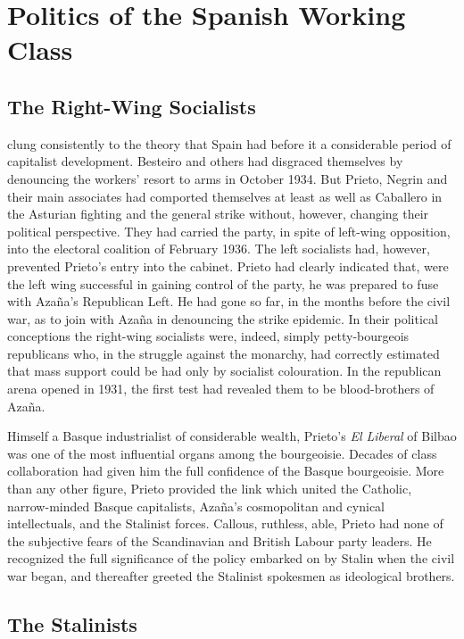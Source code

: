 \chapter{Politics of the Spanish Working Class}

\section{The Right-Wing Socialists}

 clung consistently to the theory that Spain had before it a considerable period of capitalist development. Besteiro and others had disgraced themselves by denouncing the workers’ resort to arms in October 1934. But Prieto, Negrin and their main associates had comported themselves at least as well as Caballero in the Asturian fighting and the general strike without, however, changing their political perspective. They had carried the party, in spite of left-wing opposition, into the electoral coalition of February 1936. The left socialists had, however, prevented Prieto’s entry into the cabinet. Prieto had clearly indicated that, were the left wing successful in gaining control of the party, he was prepared to fuse with Azaña’s Republican Left. He had gone so far, in the months before the civil war, as to join with Azaña in denouncing the strike epidemic. In their political conceptions the right-wing socialists were, indeed, simply petty-bourgeois republicans who, in the struggle against the monarchy, had correctly estimated that mass support could be had only by socialist colouration. In the republican arena opened in 1931, the first test had revealed them to be blood-brothers of Azaña.

Himself a Basque industrialist of considerable wealth, Prieto’s \emph{El Liberal} of Bilbao was one of the most influential organs among the bourgeoisie. Decades of class collaboration had given him the full confidence of the Basque bourgeoisie. More than any other figure, Prieto provided the link which united the Catholic, narrow-minded Basque capitalists, Azaña’s cosmopolitan and cynical intellectuals, and the Stalinist forces. Callous, ruthless, able, Prieto had none of the subjective fears of the Scandinavian and British Labour party leaders. He recognized the full significance of the policy embarked on by Stalin when the civil war began, and thereafter greeted the Stalinist spokesmen as ideological brothers.

\section{The Stalinists}


